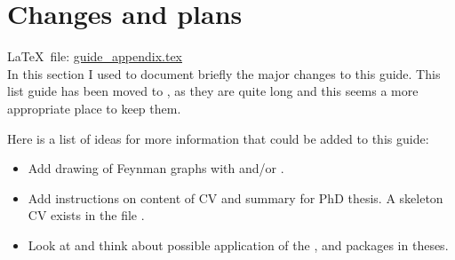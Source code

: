 
\chapter{Changes and plans}%
\label{sec:app:changes}

\LaTeX\ file: \href{run:./guide_appendix.tex}{guide\_appendix.tex}\\[1ex]
\noindent
In this section I used to document briefly the major changes to this guide.
This list guide has been moved to ,
as they are quite long and this seems a more appropriate place to keep them.

Here is a list of ideas for more information that could be added to
this guide:
\begin{itemize}
\item Add drawing of Feynman graphs with  and/or
  .
\item Add instructions on content of CV and summary for PhD thesis.
  A skeleton CV exists in the file .
\item Look at and think about possible application of the
  ,  and  packages
  in theses.
\end{itemize}























